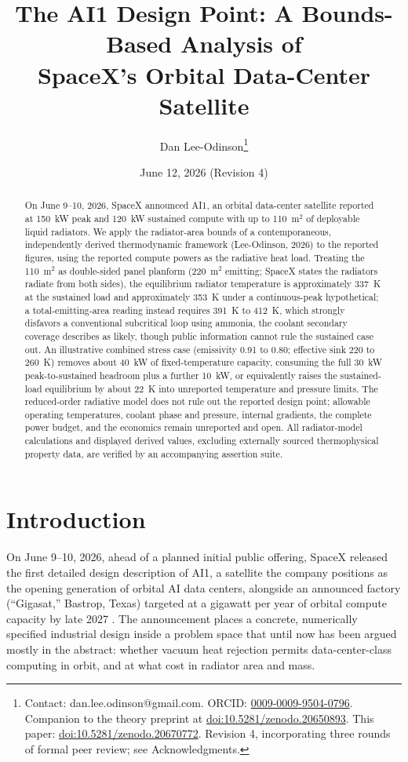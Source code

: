\documentclass[11pt]{article}
\title{The AI1 Design Point: A Bounds-Based Analysis of\\ SpaceX's Orbital Data-Center Satellite}
\author{Dan Lee-Odinson\thanks{Contact: dan.lee.odinson@gmail.com. ORCID: \href{https://orcid.org/0009-0009-9504-0796}{0009-0009-9504-0796}. Companion to the theory preprint at \href{https://doi.org/10.5281/zenodo.20650893}{doi:10.5281/zenodo.20650893}. This paper: \href{https://doi.org/10.5281/zenodo.20670772}{doi:10.5281/zenodo.20670772}. Revision 4, incorporating three rounds of formal peer review; see Acknowledgments.}}
\date{June 12, 2026 (Revision 4)}
\begin{document}
\maketitle

\begin{abstract}
On June 9--10, 2026, SpaceX announced AI1, an orbital data-center satellite reported at 150~kW peak and 120~kW sustained compute with up to 110~m$^{2}$ of deployable liquid radiators. We apply the radiator-area bounds of a contemporaneous, independently derived thermodynamic framework (Lee-Odinson, 2026) to the reported figures, using the reported compute powers as the radiative heat load. Treating the 110~m$^{2}$ as double-sided panel planform (220~m$^{2}$ emitting; SpaceX states the radiators radiate from both sides), the equilibrium radiator temperature is approximately 337~K at the sustained load and approximately 353~K under a continuous-peak hypothetical; a total-emitting-area reading instead requires 391~K to 412~K, which strongly disfavors a conventional subcritical loop using ammonia, the coolant secondary coverage describes as likely, though public information cannot rule the sustained case out. An illustrative combined stress case (emissivity 0.91 to 0.80; effective sink 220 to 260~K) removes about 40~kW of fixed-temperature capacity, consuming the full 30~kW peak-to-sustained headroom plus a further 10~kW, or equivalently raises the sustained-load equilibrium by about 22~K into unreported temperature and pressure limits. The reduced-order radiative model does not rule out the reported design point; allowable operating temperatures, coolant phase and pressure, internal gradients, the complete power budget, and the economics remain unreported and open. All radiator-model calculations and displayed derived values, excluding externally sourced thermophysical property data, are verified by an accompanying assertion suite.
\end{abstract}

\section{Introduction}

On June 9--10, 2026, ahead of a planned initial public offering, SpaceX released the first detailed design description of AI1, a satellite the company positions as the opening generation of orbital AI data centers, alongside an announced factory (``Gigasat,'' Bastrop, Texas) targeted at a gigawatt per year of orbital compute capacity by late 2027 \cite{dcd2026,toms2026,tomsgigasat2026}. The announcement places a concrete, numerically specified industrial design inside a problem space that until now has been argued mostly in the abstract: whether vacuum heat rejection permits data-center-class computing in orbit, and at what cost in radiator area and mass.
\end{document}
